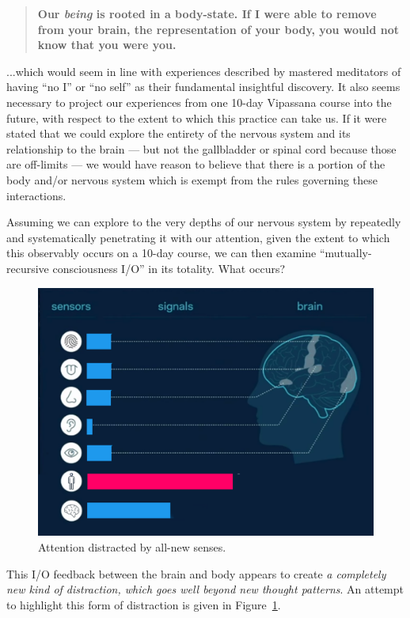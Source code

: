 \documentclass{article}
\begin{document}
\begin{quote}
  \textbf{Our \textit{being} is rooted in a body-state. If I were able to remove from your brain, the representation of your body, you would not know that you were you.}
\end{quote}

...which would seem in line with experiences described by mastered meditators of having ``no I'' or ``no self'' as their fundamental insightful discovery. It also seems necessary to project our experiences from one 10-day Vipassana course into the future, with respect to the extent to which this practice can take us. If it were stated that we could explore the entirety of the nervous system and its relationship to the brain --- but not the gallbladder or spinal cord because those are off-limits --- we would have reason to believe that there is a portion of the body and/or nervous system which is exempt from the rules governing these interactions.

Assuming we can explore to the very depths of our nervous system by repeatedly and systematically penetrating it with our attention, given the extent to which this observably occurs on a 10-day course, we can then examine ``mutually-recursive consciousness I/O'' in its totality. What occurs?

\begin{figure}[h]
  \centering
  \includegraphics[width=\linewidth]{images/ma-vipassana4.png}
  \caption{Attention distracted by all-new senses.}
  \label{fig:vipassana-sense-map-4}
\end{figure}

This I/O feedback between the brain and body appears to create \textit{a completely new kind of distraction, which goes well beyond new thought patterns}. An attempt to highlight this form of distraction is given in Figure~\ref{fig:vipassana-sense-map-4}.
\end{document}
